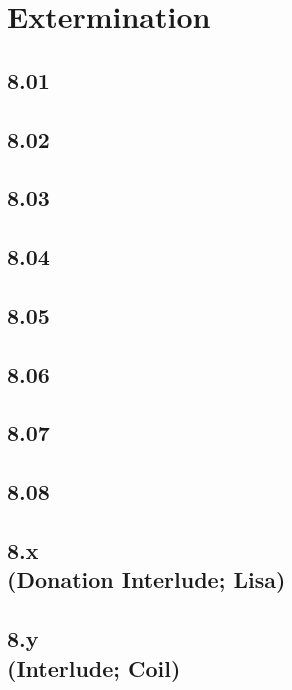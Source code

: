 \part{Extermination}

\chapter{8.01}


\chapter{8.02}


\chapter{8.03}


\chapter{8.04}


\chapter{8.05}


\chapter{8.06}


\chapter{8.07}


\chapter{8.08}


\chapter[8.x (Donation Interlude; Lisa)]{8.x\\(Donation Interlude; Lisa)}


\chapter[8.y (Interlude; Coil)]{8.y\\(Interlude; Coil)}

